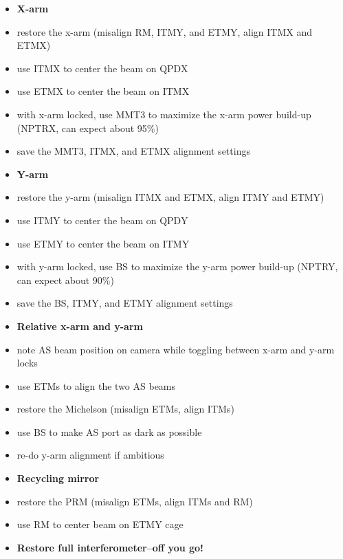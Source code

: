 \begin{itemize}
\item[] \textbf{X-arm} \vspace{-10pt}
\item restore the x-arm (misalign RM, ITMY, and ETMY, align ITMX and ETMX) \vspace{-10pt}
\item use ITMX to center the beam on QPDX \vspace{-10pt}
\item use ETMX to center the beam on ITMX \vspace{-10pt}
\item with x-arm locked, use MMT3 to maximize the x-arm power build-up (NPTRX, can expect
  about 95\%) \vspace{-10pt}
\item save the MMT3, ITMX, and ETMX alignment settings 
\item[] \textbf{Y-arm} \vspace{-10pt}
\item restore the y-arm (misalign ITMX and ETMX, align ITMY and ETMY) \vspace{-10pt}
\item use ITMY to center the beam on QPDY \vspace{-10pt}
\item use ETMY to center the beam on ITMY \vspace{-10pt}
\item with y-arm locked, use BS to maximize the y-arm power build-up (NPTRY, can expect
  about 90\%) \vspace{-10pt}
\item save the BS, ITMY, and ETMY alignment settings 
\item[] \textbf{Relative x-arm and y-arm} \vspace{-10pt}
\item note AS beam position on camera while toggling between x-arm and
  y-arm locks\vspace{-10pt}
\item use ETMs to align the two AS beams \vspace{-10pt}
\item restore the Michelson (misalign ETMs, align ITMs) \vspace{-10pt}
\item use BS to make AS port as dark as possible \vspace{-10pt}
\item re-do y-arm alignment if ambitious 
\item[] \textbf{Recycling mirror} \vspace{-10pt}
\item restore the PRM (misalign ETMs, align ITMs and RM)
  \vspace{-10pt}
\item use RM to center beam on ETMY cage 
\item[] \textbf{Restore full interferometer--off you go!}
\end{itemize}







